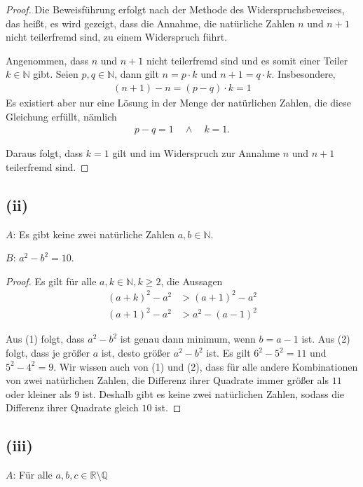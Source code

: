 \documentclass{article}
\begin{document}
\begin{proof}
  Die Beweisführung erfolgt nach der Methode des Widerspruchsbeweises,
  das heißt, es wird gezeigt, dass die Annahme, die natürliche Zahlen
  \(n\) und \(n+1\) nicht teilerfremd sind, zu einem Widerspruch führt.

  Angenommen, dass \(n\) und \(n+1\) nicht teilerfremd sind und es somit
  einer Teiler \(k \in \mathbb{N}\) gibt.  Seien \(p, q \in \mathbb{N}\),
  dann gilt \(n = p \cdot k\) und \(n+1 = q \cdot k\). Insbesondere,
\begin{align*}
  (n+1) - n = (p - q) \cdot k = 1
\end{align*}
Es existiert aber nur eine Lösung in der Menge der natürlichen Zahlen,
die diese Gleichung erfüllt, nämlich
\begin{align*}
p - q = 1 \quad \wedge \quad k = 1.
\end{align*}

Daraus folgt, dass \(k = 1\) gilt und im Widerspruch zur Annahme \(n\) und
\(n+1\) teilerfremd sind.
\end{proof}

\subsection*{(ii)}

\(A\): Es gibt keine zwei natürliche Zahlen \(a, b \in \mathbb{N}\).

\(B\): \(a^2 - b^2 = 10\).

\begin{proof}
  Es gilt für alle \(a, k \in \mathbb{N}, k \geq 2\), die Aussagen
\begin{align}
  (a+k)^2 - a^2 &>  (a+1)^2 - a^2\\
  (a+1)^2-a^2 &> a^2 - (a-1)^2
\end{align}

Aus (1) folgt, dass \(a^2 - b^2\) ist genau dann minimum, wenn
\(b = a - 1\) ist.  Aus (2) folgt, dass je größer \(a\) ist, desto größer
\(a^2 - b^2\) ist.  Es gilt \(6^2 - 5^2 = 11\) und \(5^2 - 4^2 = 9\).  Wir
wissen auch von (1) und (2), dass für alle andere Kombinationen von
zwei natürlichen Zahlen, die Differenz ihrer Quadrate immer größer als
\(11\) oder kleiner als \(9\) ist. Deshalb gibt es keine zwei natürlichen
Zahlen, sodass die Differenz ihrer Quadrate gleich \(10\) ist.
\end{proof}

\subsection*{(iii)}
\(A\): Für alle \(a, b, c \in \mathbb{R} \setminus \mathbb{Q}\)
\end{document}
